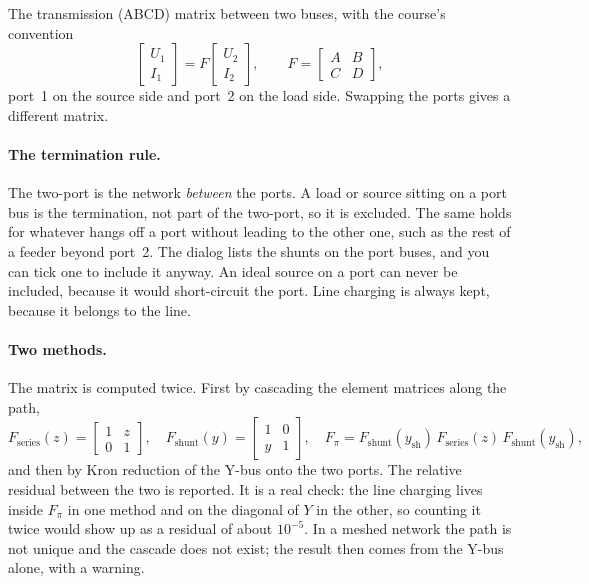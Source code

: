 The transmission (ABCD) matrix between two buses, with the course's convention
\[
  \begin{bmatrix} U_1 \\ I_1 \end{bmatrix} =
  F \begin{bmatrix} U_2 \\ I_2 \end{bmatrix}, \qquad
  F = \begin{bmatrix} A & B \\ C & D \end{bmatrix},
\]
port~1 on the source side and port~2 on the load side. Swapping the ports gives a
different matrix.



\paragraph{The termination rule.} The two-port is the network \emph{between} the ports.
A load or source sitting on a port bus is the termination, not part of the two-port, so
it is excluded. The same holds for whatever hangs off a port without leading to the other
one, such as the rest of a feeder beyond port~2. The dialog lists the shunts on the port
buses, and you can tick one to include it anyway. An ideal source on a port can never be
included, because it would short-circuit the port. Line charging is always kept, because
it belongs to the line.

\paragraph{Two methods.} The matrix is computed twice. First by cascading the element
matrices along the path,
\[
  F_\text{series}(z) = \begin{bmatrix} 1 & z \\ 0 & 1 \end{bmatrix}, \quad
  F_\text{shunt}(y) = \begin{bmatrix} 1 & 0 \\ y & 1 \end{bmatrix}, \quad
  F_\pi = F_\text{shunt}(y_\text{sh})\,F_\text{series}(z)\,F_\text{shunt}(y_\text{sh}),
\]
and then by Kron reduction of the Y-bus onto the two ports. The relative residual between
the two is reported. It is a real check: the line charging lives inside $F_\pi$ in one
method and on the diagonal of $Y$ in the other, so counting it twice would show up as a
residual of about $10^{-5}$. In a meshed network the path is not unique and the cascade
does not exist; the result then comes from the Y-bus alone, with a warning.

